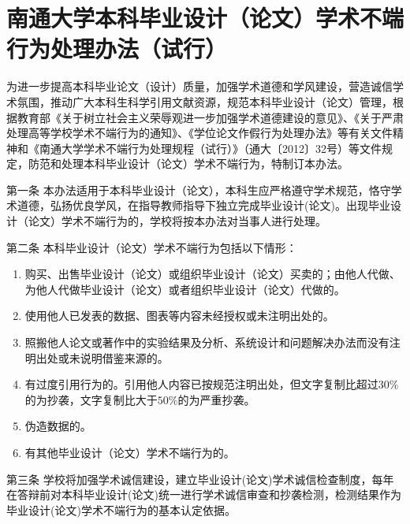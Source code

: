 \chapter{ 南通大学本科毕业设计（论文）学术不端行为处理办法（试行）}

为进一步提高本科毕业论文（设计）质量，加强学术道德和学风建设，营造诚信学术氛围，推动广大本科生科学引用文献资源，规范本科毕业设计（论文）管理，根据教育部《关于树立社会主义荣辱观进一步加强学术道德建设的意见》、《关于严肃处理高等学校学术不端行为的通知》、《学位论文作假行为处理办法》等有关文件精神和《南通大学学术不端行为处理规程（试行）》（通大〔2012〕32号）等文件规定，防范和处理本科毕业设计（论文）学术不端行为，特制订本办法。 

第一条 \quad 本办法适用于本科毕业设计（论文），本科生应严格遵守学术规范，恪守学术道德，弘扬优良学风，在指导教师指导下独立完成毕业设计(论文)。出现毕业设计（论文）学术不端行为的，学校将按本办法对当事人进行处理。 

第二条 \quad 本科毕业设计（论文）学术不端行为包括以下情形：
\begin{enumerate}
    \item 购买、出售毕业设计（论文）或组织毕业设计（论文）买卖的；由他人代做、为他人代做毕业设计（论文）或者组织毕业设计（论文）代做的。
    \item 使用他人已发表的数据、图表等内容未经授权或未注明出处的。 
    \item 照搬他人论文或著作中的实验结果及分析、系统设计和问题解决办法而没有注明出处或未说明借鉴来源的。
    \item 有过度引用行为的。引用他人内容已按规范注明出处，但文字复制比超过$30\%$的为抄袭，文字复制比大于$50\%$的为严重抄袭。
    \item 伪造数据的。 
    \item 有其他毕业设计（论文）学术不端行为的。
\end{enumerate}

第三条 \quad 学校将加强学术诚信建设，建立毕业设计(论文)学术诚信检查制度，每年在答辩前对本科毕业设计(论文)统一进行学术诚信审查和抄袭检测，检测结果作为毕业设计(论文)学术不端行为的基本认定依据。 

